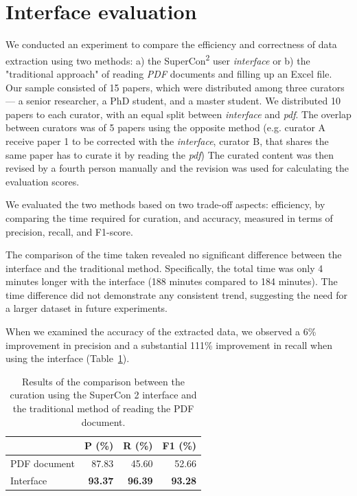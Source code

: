 \documentclass[a4paper]{article}
\begin{document}
\section{Interface evaluation}
\label{sec:interface-evaluation}
We conducted an experiment to compare the efficiency and correctness of data extraction using two methods: a) the SuperCon\textsuperscript{2} user \textit{interface} or b) the "traditional approach" of reading \textit{PDF} documents and filling up an Excel file. 
Our sample consisted of 15 papers, which were distributed among three curators — a senior researcher, a PhD student, and a master student. 
We distributed 10 papers to each curator, with an equal split between \textit{interface} and \textit{pdf}. The overlap between curators was of 5 papers using the opposite method (e.g. curator A receive paper 1 to be corrected with the \textit{interface}, curator B, that shares the same paper has to curate it by reading the \textit{pdf})
The curated content was then revised by a fourth person manually and the revision was used for calculating the evaluation scores. 

We evaluated the two methods based on two trade-off aspects: efficiency, by comparing the time required for curation, and accuracy, measured in terms of precision, recall, and F1-score.

The comparison of the time taken revealed no significant difference between the interface and the traditional method. Specifically, the total time was only 4 minutes longer with the interface (188 minutes compared to 184 minutes). The time difference did not demonstrate any consistent trend, suggesting the need for a larger dataset in future experiments.

When we examined the accuracy of the extracted data, we observed a 6\% improvement in precision and a substantial 111\% improvement in recall when using the interface (Table~\ref{tab:evaluation-interface-correction}). 

\begin{table}[ht]
\centering
\caption{Results of the comparison between the curation using the SuperCon 2 interface and the traditional method of reading the PDF document. }
\begin{tabular}{lrrr}
\toprule
                    & \textbf{P (\%)}   & \textbf{R (\%)}   & \textbf{F1 (\%)}  \\
    \midrule
    PDF document    & 87.83             & 45.60             & 52.66             \\
    Interface       & \textbf{93.37}    & \textbf{96.39}    & \textbf{93.28}    \\
    \bottomrule
\end{tabular}
\label{tab:evaluation-interface-correction}
\end{table}
\end{document}
